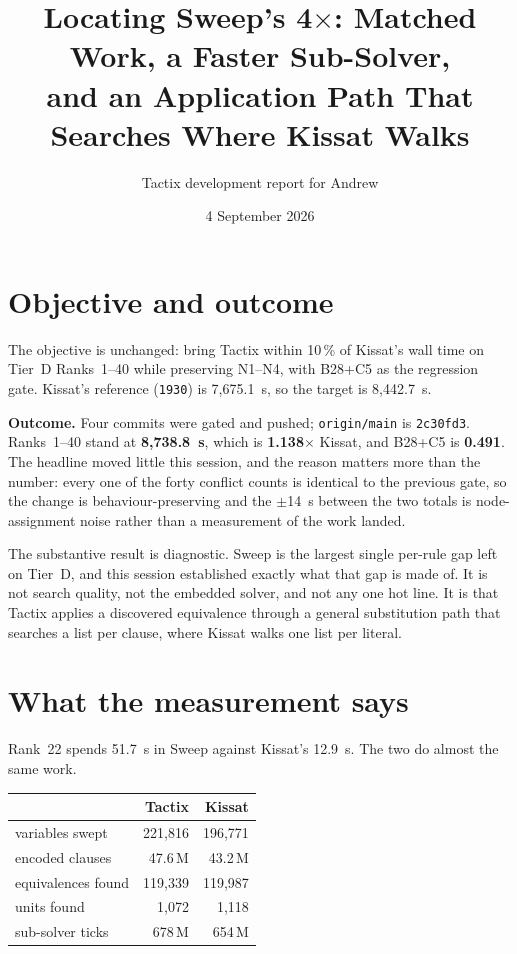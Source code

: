 \documentclass[11pt]{article}
\title{Locating Sweep's 4$\times$: Matched Work, a Faster Sub-Solver,\\
and an Application Path That Searches Where Kissat Walks}
\author{Tactix development report for Andrew}
\date{4 September 2026}
\newcommand{\code}[1]{\texttt{#1}}
\begin{document}
\maketitle

\section{Objective and outcome}

The objective is unchanged: bring Tactix within 10\,\% of Kissat's wall time on
Tier~D Ranks~1--40 while preserving N1--N4, with B28+C5 as the regression gate.
Kissat's reference (\code{1930}) is 7{,}675.1~s, so the target is 8{,}442.7~s.

\textbf{Outcome.} Four commits were gated and pushed; \code{origin/main} is
\code{2c30fd3}. Ranks~1--40 stand at \textbf{8{,}738.8~s}, which is
\textbf{1.138$\times$} Kissat, and B28+C5 is \textbf{0.491}. The headline moved
little this session, and the reason matters more than the number: every one of
the forty conflict counts is identical to the previous gate, so the change is
behaviour-preserving and the $\pm$14~s between the two totals is
node-assignment noise rather than a measurement of the work landed.

The substantive result is diagnostic. Sweep is the largest single per-rule gap
left on Tier~D, and this session established exactly what that gap is made of.
It is not search quality, not the embedded solver, and not any one hot line.
It is that Tactix applies a discovered equivalence through a general
substitution path that searches a list per clause, where Kissat walks one list
per literal.

\section{What the measurement says}

Rank~22 spends 51.7~s in Sweep against Kissat's 12.9~s. The two do almost the
same work.

\begin{center}
\begin{tabular}{lrr}
\toprule
 & Tactix & Kissat \\
\midrule
variables swept        & 221{,}816 & 196{,}771 \\
encoded clauses        & 47.6\,M   & 43.2\,M \\
equivalences found     & 119{,}339 & 119{,}987 \\
units found            & 1{,}072   & 1{,}118 \\
sub-solver ticks       & 678\,M    & 654\,M \\
\bottomrule
\end{tabular}
\end{center}
\end{document}
